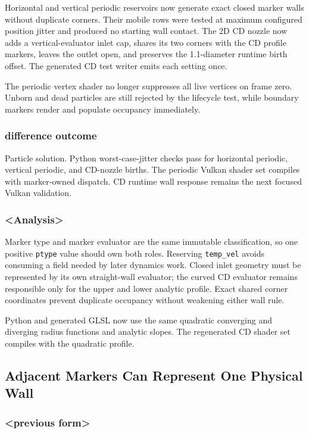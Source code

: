 Horizontal and vertical periodic reservoirs now generate exact closed marker
walls without duplicate corners.  Their mobile rows were tested at maximum
configured position jitter and produced no starting wall contact.  The 2D CD
nozzle now adds a vertical-evaluator inlet cap, shares its two corners with the
CD profile markers, leaves the outlet open, and preserves the 1.1-diameter
runtime birth offset.  The generated CD test writer emits each setting once.

The periodic vertex shader no longer suppresses all live vertices on frame
zero.  Unborn and dead particles are still rejected by the lifecycle test,
while boundary markers render and populate occupancy immediately.

\subsubsection{difference outcome}

Particle solution.  Python worst-case-jitter checks pass for horizontal
periodic, vertical periodic, and CD-nozzle births.  The periodic Vulkan shader
set compiles with marker-owned dispatch.  CD runtime wall response remains the
next focused Vulkan validation.

\subsubsection{<Analysis>}

Marker type and marker evaluator are the same immutable classification, so one
positive \texttt{ptype} value should own both roles.  Reserving
\texttt{temp\_vel} avoids consuming a field needed by later dynamics work.
Closed inlet geometry must be represented by its own straight-wall evaluator;
the curved CD evaluator remains responsible only for the upper and lower
analytic profile.  Exact shared corner coordinates prevent duplicate occupancy
without weakening either wall rule.

Python and generated GLSL now use the same quadratic converging and diverging
radius functions and analytic slopes.  The regenerated CD shader set compiles
with the quadratic profile.

\subsection{Adjacent Markers Can Represent One Physical Wall}

\subsubsection{<previous form>}

